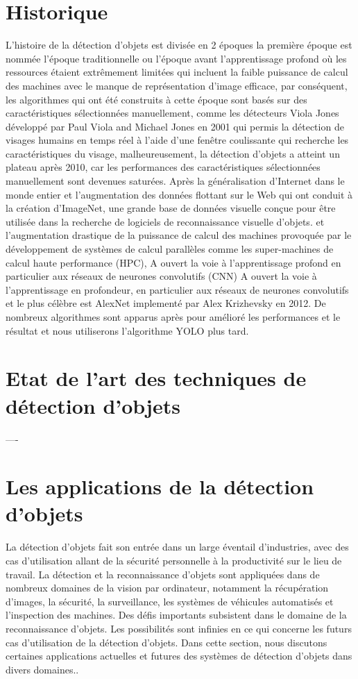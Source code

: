 \section{Historique}
L'histoire de la détection d'objets est divisée en 2 époques la première époque est nommée l'époque traditionnelle ou l'époque avant l'apprentissage profond où les ressources étaient extrêmement limitées qui incluent la faible puissance de calcul des machines avec le manque de représentation d'image efficace, par conséquent, les algorithmes qui ont été construits à cette époque sont basés sur des caractéristiques sélectionnées manuellement, comme les détecteurs Viola Jones développé par Paul Viola and Michael Jones en 2001
qui permis la détection de visages humains en temps réel à l'aide d'une fenêtre coulissante qui recherche les caractéristiques du visage, malheureusement, la détection d'objets a atteint un plateau après 2010, car les performances des caractéristiques sélectionnées manuellement sont devenues saturées.
Après la généralisation d'Internet dans le monde entier et l'augmentation des données flottant sur le Web qui ont conduit à la création d'ImageNet, une grande base de données visuelle conçue pour être utilisée dans la recherche de logiciels de reconnaissance visuelle d'objets. et l'augmentation drastique de la puissance de calcul des machines provoquée par le développement de systèmes de calcul parallèles comme les super-machines de calcul haute performance (HPC), A ouvert la voie à l'apprentissage profond en particulier aux réseaux de neurones convolutifs (CNN) A ouvert la voie à l'apprentissage en profondeur, en particulier aux réseaux de neurones
convolutifs et le plus célèbre est AlexNet implementé par Alex Krizhevsky en 2012. De nombreux algorithmes sont apparus après pour amélioré les performances et le résultat et nous utiliserons l'algorithme YOLO plus tard.
\section{Etat de l'art des techniques de détection d'objets}

----

 
\section{Les applications de la détection d'objets}
La détection d'objets fait son entrée dans un large éventail d'industries, avec des cas d'utilisation allant de la sécurité personnelle à la productivité sur le lieu de travail. La détection et la reconnaissance d'objets sont appliquées dans de nombreux domaines de la vision par ordinateur, notamment la récupération d'images, la sécurité, la surveillance, les systèmes de véhicules automatisés et l'inspection des machines. Des défis importants subsistent dans le domaine de la reconnaissance d'objets. Les possibilités sont infinies en ce qui concerne les futurs cas d'utilisation de la détection d'objets. Dans cette section, nous discutons  certaines applications actuelles et futures  des systèmes de détection d'objets dans divers domaines..
